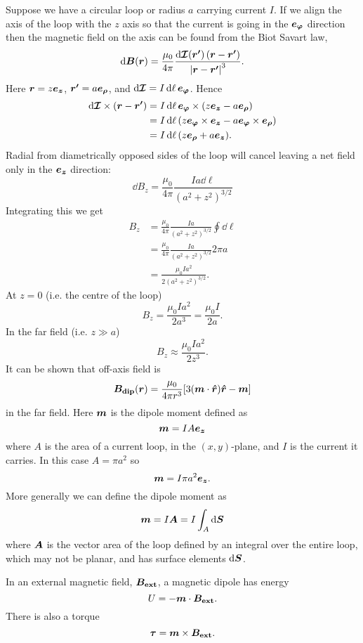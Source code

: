     Suppose we have a circular loop or radius \(a\) carrying current \(I\).
    If we align the axis of the loop with the \(z\) axis so that the current is going in the \(\bm{e_{\varphi}}\) direction then the magnetic field on the axis can be found from the Biot Savart law,
    \[\dd{\bm{B}(\bm{r})} = \frac{\mu_0}{4\pi} \frac{\dd{\bm{\mathcal{I}}(\bm{r'})} (\bm{r} - \bm{r'})}{\abs{\bm{r} - \bm{r'}}^3}.\]
    Here \(\bm{r} = z\bm{e_{z}}\), \(\bm{r'} = a\bm{e_{\rho}}\), and \(\dd{\bm{\mathcal{I}}} = I\dd{\ell}\bm{e_{\varphi}}\).
    Hence
    \begin{align*}
        \dd{\bm{\mathcal{I}}} \times (\bm{r} - \bm{r'}) &= I\dd{\ell}\bm{e_{\varphi}} \times (z\bm{e_{z}} - a\bm{e_{\rho}})\\
        &= I\dd{\ell}(z\bm{e_{\varphi}}\times\bm{e_{z}} - a\bm{e_{\varphi}}\times\bm{e_{\rho}})\\
        &= I\dd{\ell}(z\bm{e_{\rho}} + a\bm{e_{z}}).
    \end{align*}
    Radial from diametrically opposed sides of the loop will cancel leaving a net field only in the \(\bm{e_{z}}\) direction:
    \[\dd{B_z} = \frac{\mu_0}{4\pi}\frac{Ia\dd{\ell}}{(a^2 + z^2)^{3/2}}\]
    Integrating this we get
    \begin{align*}
        B_z &= \frac{\mu_0}{4\pi} \frac{Ia}{(a^2 + z^2)^{3/2}} \oint\dd{\ell}\\
        &= \frac{\mu_0}{4\pi} \frac{Ia}{(a^2 + z^2)^{3/2}}2\pi a\\
        &= \frac{\mu_0Ia^2}{2(a^2 + z^2)^{3/2}}.
    \end{align*}
    At \(z = 0\) (i.e. the centre of the loop)
    \[B_z = \frac{\mu_0Ia^2}{2a^3} = \frac{\mu_0I}{2a}.\]
    In the far field (i.e. \(z \gg a\))
    \[B_z \approx \frac{\mu_0Ia^2}{2z^3}.\]
    It can be shown that off-axis field is
    \[\bm{B_{\mathrm{dip}}}(\bm{r}) = \frac{\mu_0}{4\pi r^3} [3(\bm{m}\cdot\bm{\hat{r}})\bm{\hat{r}} - \bm{m}]\]
    in the far field.
    Here \(\bm{m}\) is the dipole moment defined as
    \[\bm{m} = IA\bm{e_{z}}\]
    where \(A\) is the area of a current loop, in the \((x, y)\)-plane, and \(I\) is the current it carries.
    In this case \(A = \pi a^2\) so
    \[\bm{m} = I\pi a^2\bm{e_{z}}.\]
    More generally we can define the dipole moment as
    \[\bm{m} = I\bm{A} = I\int_A\dd{\bm{S}}\]
    where \(\bm{A}\) is the vector area of the loop defined by an integral over the entire loop, which may not be planar, and has surface elements \(\dd{\bm{S}}\).
    
    In an external magnetic field, \(\bm{B_\mathrm{ext}}\), a magnetic dipole has energy
    \[U = -\bm{m}\cdot\bm{B_\mathrm{ext}}.\]
    There is also a torque
    \[\bm{\tau} = \bm{m}\times\bm{B_\mathrm{ext}}.\]
    
